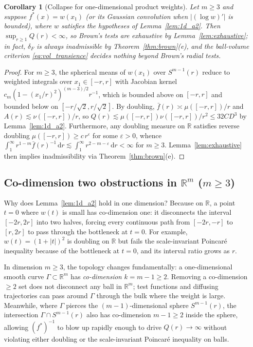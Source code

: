 \documentclass[a4paper,11pt,noarxiv]{quantumarticle}
\newcommand{\R}{\mathbb{R}}
\newcommand{\abs}[1]{\lvert #1\rvert}
\newcommand{\dd}{\,\mathrm{d}}
\newcommand{\fbar}{\bar f}
\theoremstyle{plain}
\newtheorem{corollary}[theorem]{Corollary}
\theoremstyle{definition}
\theoremstyle{remark}
\begin{document}
\begin{corollary}[Collapse for one-dimensional product weights]
\label{cor:product}
Let $m\ge3$ and suppose $f^*(x)=w(x_1)$ (or its Gaussian convolution
when $\abs{(\log w)'}$ is bounded), where $w$ satisfies the hypotheses
of Lemma~\ref{lem:1d_a2}. Then $\sup_{r\ge1}Q(r)<\infty$, so Brown's
tests are exhaustive by Lemma~\ref{lem:exhaustive}; in fact, $\delta_F$
is always inadmissible by Theorem~\ref{thm:brown}(e), and the
ball-volume criterion \eqref{eq:vol_transience} decides nothing beyond
Brown's radial tests.
\end{corollary}

\begin{proof}
For $m\ge3$, the spherical means of $w(x_1)$ over $S^{m-1}(r)$ reduce to
weighted integrals over $x_1\in[-r,r]$ with Jacobian kernel
$c_m(1-(x_1/r)^2)^{(m-3)/2}r^{-1}$, which is bounded above on $[-r,r]$
and bounded below on $[-r/\sqrt{2},r/\sqrt{2}]$. By doubling,
$\fbar(r)\asymp\mu([-r,r])/r$ and $A(r)\lesssim\nu([-r,r])/r$, so
$Q(r)\lesssim\mu([-r,r])\nu([-r,r])/r^2\le 32CD^3$ by
Lemma~\ref{lem:1d_a2}. Furthermore, any doubling measure on $\R$
satisfies reverse doubling $\mu([-r,r])\ge c\,r^\varepsilon$ for some
$\varepsilon>0$, whence $\int_1^\infty r^{1-m}\fbar(r)^{-1}\dd r
\lesssim\int_1^\infty r^{2-m-\varepsilon}\dd r<\infty$ for $m\ge3$.
Lemma~\ref{lem:exhaustive} then implies inadmissibility via
Theorem~\ref{thm:brown}(e).
\end{proof}

\subsection{Co-dimension two obstructions in \texorpdfstring{$\R^m$ ($m\ge3$)}{Rm (m>=3)}}

Why does Lemma~\ref{lem:1d_a2} hold in one dimension? Because on $\R$, a
point $t=0$ where $w(t)$ is small has co-dimension one: it disconnects
the interval $[-2r,2r]$ into two halves, forcing every continuous path
from $[-2r,-r]$ to $[r,2r]$ to pass through the bottleneck at $t=0$.
For example, $w(t)=(1+\abs{t})^2$ is doubling on $\R$ but fails the
scale-invariant Poincar\'e inequality because of the bottleneck at $t=0$,
and its interval ratio grows as $r$.

In dimension $m\ge3$, the topology changes fundamentally: a
one-dimensional smooth curve $\Gamma\subset\R^m$ has \emph{co-dimension
$k=m-1\ge2$}. Removing a co-dimension $\ge2$ set does not disconnect
any ball in $\R^m$; test functions and diffusing trajectories can pass
around $\Gamma$ through the bulk where the weight is large. Meanwhile,
where $\Gamma$ pierces the $(m-1)$-dimensional sphere $S^{m-1}(r)$, the
intersection $\Gamma\cap S^{m-1}(r)$ also has co-dimension $m-1\ge2$
inside the sphere, allowing $(f^*)^{-1}$ to blow up rapidly enough to
drive $Q(r)\to\infty$ without violating either doubling or the
scale-invariant Poincar\'e inequality on balls.
\end{document}
